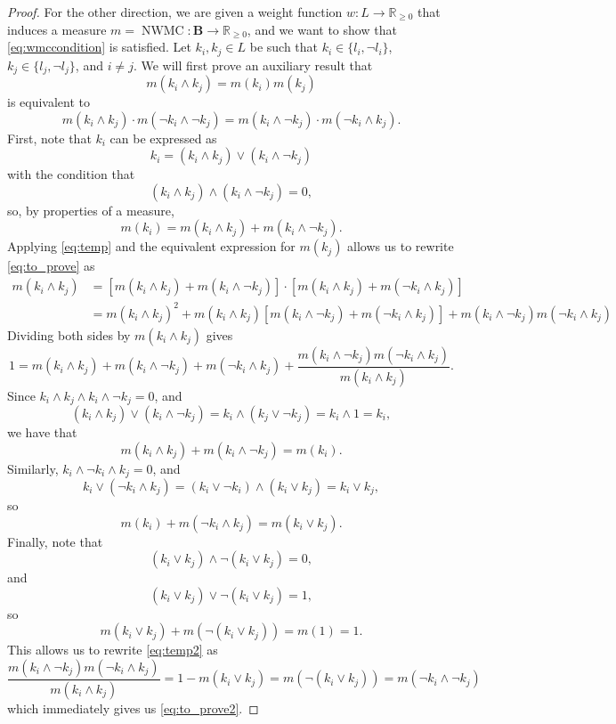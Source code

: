 \documentclass{article}
\theoremstyle{definition}
\theoremstyle{remark}
\DeclareMathOperator{\nWMC}{NWMC}
\begin{document}
\begin{proof}
  For the other direction, we are given a weight function $w\colon L \to
  \mathbb{R}_{\ge 0}$ that induces a measure $m = \nWMC\colon \mathbf{B} \to
  \mathbb{R}_{\ge 0}$, and we want to show that \cref{eq:wmccondition} is
  satisfied. Let $k_i, k_j \in L$ be such that $k_i \in \{ l_i, \neg l_i \}$,
  $k_j \in \{ l_j, \neg l_j \}$, and $i \ne j$. We will first prove an auxiliary
  result that
  \begin{equation} \label{eq:to_prove}
    m(k_i \land k_j) = m(k_i)m(k_j)
  \end{equation}
  is equivalent to
  \begin{equation} \label{eq:to_prove2}
    m(k_i \land k_j) \cdot m(\neg k_i \land \neg k_j) = m(k_i \land \neg k_j)
    \cdot m(\neg k_i \land k_j).
  \end{equation}
  First, note that $k_i$ can be expressed as
  \[
    k_i = (k_i \land k_j) \lor (k_i \land \neg k_j)
  \]
  with the condition that
  \[
    (k_i \land k_j) \land (k_i \land \neg k_j) = 0,
  \]
  so, by properties of a measure,
  \begin{equation} \label{eq:temp}
    m(k_i) = m(k_i \land k_j) + m(k_i \land \neg k_j).
  \end{equation}
  Applying \cref{eq:temp} and the equivalent expression for $m(k_j)$ allows us
  to rewrite \cref{eq:to_prove} as
  \begin{align*}
    m(k_i \land k_j) &= [m(k_i \land k_j) + m(k_i \land \neg k_j)] \cdot [m(k_i \land k_j) + m(\neg k_i \land k_j)] \\
                     &= m(k_i \land k_j)^2 + m(k_i \land k_j)[m(k_i \land \neg k_j) + m(\neg k_i \land k_j)] + m(k_i \land \neg k_j)m(\neg k_i \land k_j)
  \end{align*}
  Dividing both sides by $m(k_i \land k_j)$ gives
  \begin{equation} \label{eq:temp2}
    1 = m(k_i \land k_j) + m(k_i \land \neg k_j) + m(\neg k_i \land k_j) +
    \frac{m(k_i \land \neg k_j)m(\neg k_i \land k_j)}{m(k_i \land k_j)}.
  \end{equation}
  Since $k_i \land k_j \land k_i \land \neg k_j = 0$, and
  \[
    (k_i \land k_j) \lor (k_i \land \neg k_j) = k_i \land (k_j \lor \neg k_j) =
    k_i \land 1 = k_i,
  \]
  we have that
  \[
    m(k_i \land k_j) + m(k_i \land \neg k_j) = m(k_i).
  \]
  Similarly, $k_i \land \neg k_i \land k_j = 0$, and
  \[
    k_i \lor (\neg k_i \land k_j) = (k_i \lor \neg k_i) \land (k_i \lor k_j) =
    k_i \lor k_j,
  \]
  so
  \[
    m(k_i) + m(\neg k_i \land k_j) = m(k_i \lor k_j).
  \]
  Finally, note that
  \[
    (k_i \lor k_j) \land \neg(k_i \lor k_j) = 0,
  \]
  and
  \[
    (k_i \lor k_j) \lor \neg(k_i \lor k_j) = 1,
  \]
  so
  \[
    m(k_i \lor k_j) + m(\neg(k_i \lor k_j)) = m(1) = 1.
  \]
  This allows us to rewrite \cref{eq:temp2} as
  \[
    \frac{m(k_i \land \neg k_j)m(\neg k_i \land k_j)}{m(k_i \land k_j)} = 1 -
    m(k_i \lor k_j) = m(\neg(k_i \lor k_j)) = m(\neg k_i \land \neg k_j)
  \]
  which immediately gives us \cref{eq:to_prove2}.


\end{proof}
\end{document}
